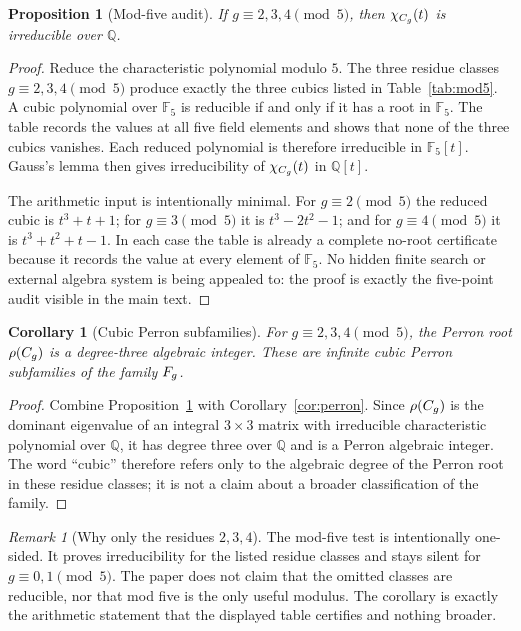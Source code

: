 \documentclass[11pt]{article}
\newtheorem{proposition}[theorem]{Proposition}
\newtheorem{corollary}[theorem]{Corollary}
\theoremstyle{remark}
\newtheorem{remark}[theorem]{Remark}
\numberwithin{equation}{section}
\begin{document}
\begin{proposition}[Mod-five audit]\label{prop:mod5}
If \(g\equiv 2,3,4 \pmod 5\), then \(\chi_{C_g}(t)\) is irreducible over
\(\mathbb Q\).
\end{proposition}

\begin{proof}
Reduce the characteristic polynomial modulo \(5\).  The three residue classes
\(g\equiv 2,3,4\pmod 5\) produce exactly the three cubics listed in
Table~\ref{tab:mod5}.  A cubic polynomial over \(\mathbb F_5\) is reducible if
and only if it has a root in \(\mathbb F_5\).  The table records the values at
all five field elements and shows that none of the three cubics vanishes.  Each
reduced polynomial is therefore irreducible in \(\mathbb F_5[t]\).  Gauss's
lemma then gives irreducibility of \(\chi_{C_g}(t)\) in \(\mathbb Q[t]\).
\par
The arithmetic input is intentionally minimal.  For \(g\equiv 2\pmod 5\) the
reduced cubic is \(t^3+t+1\); for \(g\equiv 3\pmod 5\) it is \(t^3-2t^2-1\);
and for \(g\equiv 4\pmod 5\) it is \(t^3+t^2+t-1\).  In each case the table is
already a complete no-root certificate because it records the value at every
element of \(\mathbb F_5\).  No hidden finite search or external algebra system
is being appealed to: the proof is exactly the five-point audit visible in the
main text.
\end{proof}

\begin{corollary}[Cubic Perron subfamilies]\label{cor:cubic}
For \(g\equiv 2,3,4 \pmod 5\), the Perron root \(\rho(C_g)\) is a degree-three
algebraic integer.  These are infinite cubic Perron subfamilies of the family
\(F_g\).
\end{corollary}

\begin{proof}
Combine Proposition~\ref{prop:mod5} with Corollary~\ref{cor:perron}.  Since
\(\rho(C_g)\) is the dominant eigenvalue of an integral \(3\times 3\) matrix
with irreducible characteristic polynomial over \(\mathbb Q\), it has degree
three over \(\mathbb Q\) and is a Perron algebraic integer.  The word
``cubic'' therefore refers only to the algebraic degree of the Perron root in
these residue classes; it is not a claim about a broader classification of the
family.
\end{proof}

\begin{remark}[Why only the residues \(2,3,4\)]\label{rem:mod5}
The mod-five test is intentionally one-sided.  It proves irreducibility for the
listed residue classes and stays silent for \(g\equiv 0,1\pmod 5\).  The paper
does not claim that the omitted classes are reducible, nor that mod five is the
only useful modulus.  The corollary is exactly the arithmetic statement that
the displayed table certifies and nothing broader.
\end{remark}
\end{document}
